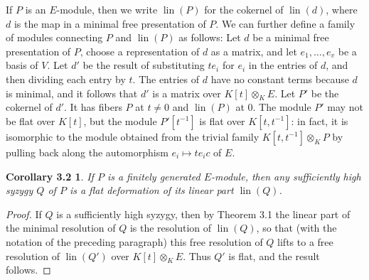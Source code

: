 \documentclass{tran-l}
\newcommand{\lin}{\operatorname{lin}}
\theoremstyle{plain}
\newtheorem*{theorem11}{Corollary 3.2}
\theoremstyle{remark}
\theoremstyle{definition}
\begin{document}
If $P$ is an $E$-module, then we write $\lin (P)$ for the cokernel of
$\lin (d)$, where $d$ is the map in a minimal free presentation of
$P$. We can further define a family of modules connecting $P$ and
$\lin (P)$ as follows: Let $d$ be a minimal free presentation of $P$,
choose a representation of $d$ as a matrix, and let $e_{1},\dots ,e_{v}$ be
a basis of $V$.  Let $d'$ be the result of substituting $te_{i}$ for
$e_{i}$ in the entries of $d$, and then dividing each entry by $t$. The
entries of $d$ have no constant terms because $d$ is minimal, and it
follows that $d'$ is a matrix over $K[t]\otimes _{K} E$. Let $P'$ be
the cokernel of $d'$. It has
fibers $P$ at $t\neq 0$ and $\lin (P)$ at 0.
The module $P'$ may not be flat over $K[t]$,
but the module $P'[t^{-1}]$ is flat over $K[t,t^{-1}]$:
in fact, it is
isomorphic to the module obtained
from the trivial family $K[t,t^{-1}]\otimes _{K} P$ by pulling back
along the automorphism $e_{i}\mapsto te_{i}c$ of $E$.

\begin{theorem11}
If $P$ is a finitely generated $E$-module,
then any sufficiently high syzygy $Q$ of $P$ is a flat deformation
of its linear part $\lin (Q)$.
\end{theorem11}
\begin{proof}  If $Q$ is a sufficiently high syzygy, then by
Theorem 3.1 the linear part of the minimal resolution of $Q$
is the resolution of $\lin (Q)$, so that
(with the notation of the preceding paragraph) this free resolution of
$Q$ lifts to a free resolution of $\lin (Q')$ over $K[t]\otimes _{K} E$.
Thus $Q'$ is flat, and the result follows.
\end{proof}
\end{document}

